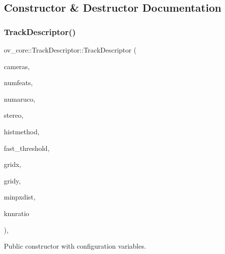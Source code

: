\subsection{Constructor \& Destructor Documentation}
\mbox{\label{classov__core_1_1TrackDescriptor_a5f7793abdb80621d2d41e619cd46b9cf}} 
\subsubsection{\texorpdfstring{Track\+Descriptor()}{TrackDescriptor()}}
{\footnotesize\ttfamily ov\+\_\+core\+::\+Track\+Descriptor\+::\+Track\+Descriptor (\begin{DoxyParamCaption}\item[{std\+::unordered\+\_\+map$<$ size\+\_\+t, std\+::shared\+\_\+ptr$<$ \hyperlink{classov__core_1_1CamBase}{Cam\+Base} $>$$>$}]{cameras,  }\item[{int}]{numfeats,  }\item[{int}]{numaruco,  }\item[{bool}]{stereo,  }\item[{\hyperlink{classov__core_1_1TrackBase_aa4b34a5dce99b59522d57bf9278c9a1a}{Histogram\+Method}}]{histmethod,  }\item[{int}]{fast\+\_\+threshold,  }\item[{int}]{gridx,  }\item[{int}]{gridy,  }\item[{int}]{minpxdist,  }\item[{double}]{knnratio }\end{DoxyParamCaption})\hspace{0.3cm}{\ttfamily [inline]}, {\ttfamily [explicit]}}



Public constructor with configuration variables. 



